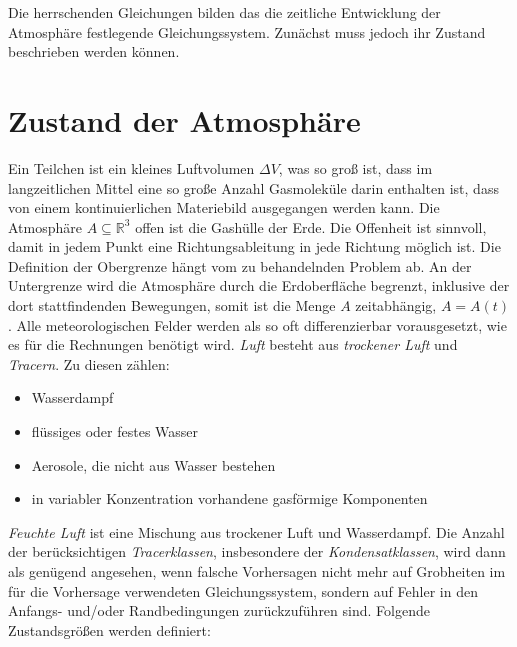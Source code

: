 \documentclass{book}
\begin{document}
Die herrschenden Gleichungen bilden das die zeitliche Entwicklung der Atmosphäre festlegende Gleichungssystem. Zunächst muss jedoch ihr Zustand beschrieben werden können.

\section{Zustand der Atmosphäre}
\label{sec:zustand_der_atmosphaere}

Ein Teilchen ist ein kleines Luftvolumen $\Delta V$, was so groß ist, dass im langzeitlichen Mittel eine so große Anzahl Gasmoleküle darin enthalten ist, dass von einem kontinuierlichen Materiebild ausgegangen werden kann. Die Atmosphäre $A\subseteq\mathbb{R}^3$ offen ist die Gashülle der Erde. Die Offenheit ist sinnvoll, damit in jedem Punkt eine Richtungsableitung in jede Richtung möglich ist. Die Definition der Obergrenze hängt vom zu behandelnden Problem ab. An der Untergrenze wird die Atmosphäre durch die Erdoberfläche begrenzt, inklusive der dort stattfindenden Bewegungen, somit ist die Menge $A$ zeitabhängig, $A = A\left(t\right)$. Alle meteorologischen Felder werden als so oft differenzierbar vorausgesetzt, wie es für die Rechnungen benötigt wird. \textit{Luft} besteht aus \textit{trockener Luft} und \textit{Tracern}. Zu diesen zählen:
%
\begin{itemize}
\item Wasserdampf
\item flüssiges oder festes Wasser
\item Aerosole, die nicht aus Wasser bestehen
\item in variabler Konzentration vorhandene gasförmige Komponenten
\end{itemize}
%
\textit{Feuchte Luft} ist eine Mischung aus trockener Luft und Wasserdampf. Die Anzahl der berücksichtigen \textit{Tracerklassen}, insbesondere der \textit{Kondensatklassen}, wird dann als genügend angesehen, wenn falsche Vorhersagen nicht mehr auf Grobheiten im für die Vorhersage verwendeten Gleichungssystem, sondern auf Fehler in den Anfangs- und/oder Randbedingungen zurückzuführen sind. Folgende Zustandsgrößen werden definiert:
%
\end{document}
